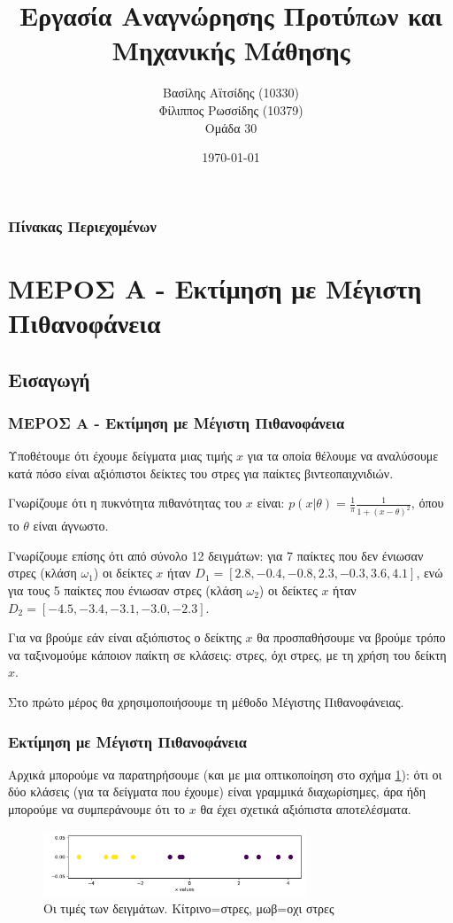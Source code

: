 \documentclass{beamer}
\title[Ομάδα 30] 
{Εργασία Αναγνώρησης Προτύπων και Μηχανικής Μάθησης}
\author[Βασίλης Αϊτσίδης, Φίλιππος Ρωσσίδης]
{Βασίλης Αϊτσίδης (10330) \\ Φίλιππος Ρωσσίδης (10379) \\ Ομάδα 30}
\institute{ΑΠΘ}
\date{\today}
\begin{document}
\frame{\titlepage}


\begin{frame}
    \frametitle{Πίνακας Περιεχομένων}
    \small
    \tableofcontents[hideallsubsections]
\end{frame}

\section{ΜΕΡΟΣ Α - Εκτίμηση με Μέγιστη Πιθανοφάνεια}
\subsection{Εισαγωγή}
\begin{frame}
\frametitle{ΜΕΡΟΣ Α - Εκτίμηση με Μέγιστη Πιθανοφάνεια}

Υποθέτουμε ότι έχουμε δείγματα μιας τιμής $x$ για τα οποία θέλουμε να
αναλύσουμε κατά πόσο είναι αξιόπιστοι δείκτες του στρες για παίκτες βιντεοπαιχνιδιών.

Γνωρίζουμε ότι η πυκνότητα πιθανότητας του $x$ είναι: 
$p(x|\theta) = \frac{1}{\pi} \frac{1}{1+(x-\theta)^2}$, όπου το $\theta$ 
είναι άγνωστο. 

Γνωρίζουμε επίσης ότι από σύνολο 12 δειγμάτων: για 7 παίκτες που δεν ένιωσαν στρες (κλάση $\omega_1$)
οι δείκτες $x$ ήταν $D_1=[ 2.8, -0.4, -0.8, 2.3,-0.3,3.6,4.1]$, ενώ για τους 5 παίκτες
που ένιωσαν στρες (κλάση $\omega_2$) 
οι δείκτες $x$ ήταν $D_2=[-4.5,-3.4,-3.1,-3.0,-2.3]$. 


Για να βρούμε εάν είναι αξιόπιστος ο δείκτης $x$ θα προσπαθήσουμε να βρούμε τρόπο
να ταξινομούμε κάποιον παίκτη σε κλάσεις: στρες, όχι στρες, με τη χρήση του 
δείκτη $x$. 

Στο πρώτο μέρος θα χρησιμοποιήσουμε τη μέθοδο Μέγιστης Πιθανοφάνειας.

\end{frame}



\begin{frame}
\frametitle{Εκτίμηση με Μέγιστη Πιθανοφάνεια}

Αρχικά μπορούμε να παρατηρήσουμε (και με μια οπτικοποίηση στο σχήμα \ref{fig:1}): ότι 
οι δύο κλάσεις (για τα δείγματα που έχουμε) είναι γραμμικά διαχωρίσημες, άρα 
ήδη μπορούμε να συμπεράνουμε ότι το $x$ θα έχει σχετικά αξιόπιστα αποτελέσματα.


\begin{figure}
    \centering
        \includegraphics[width=0.7\textwidth]{../plots/Figure_1.pdf}
        \caption{Οι τιμές των δειγμάτων. Κίτρινο=στρες, μωβ=οχι στρες}
        \label{fig:1}
\end{figure}



\end{frame}
\end{document}
